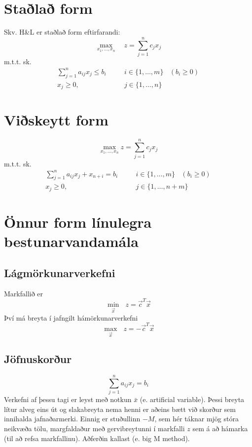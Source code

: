\lstset{language=matlab}

\section{Staðlað form}
Skv. H\&L er staðlað form eftirfarandi:
$$\max_{x_1,\ldots,x_n} \quad z = \sum_{j=1}^n c_j x_j  $$
m.t.t. sk.
\begin{eqnarray*}
\sum_{j=1}^n a_{ij} x_j  \le  b_i &\quad& i\in\{1,\ldots,m\}~~~~ (b_i \ge 0)\\
x_j  \ge  0, && j\in\{1,\ldots, n\}
\end{eqnarray*}
\section{Viðskeytt form}
$$\max_{x_1,\ldots,x_n}  z = \sum_{j=1}^n c_j x_j $$
m.t.t. sk.
\begin{eqnarray*}
\sum_{j=1}^n a_{ij} x_j  + x_{n+i} =  b_i &\quad& i\in\{1,\ldots,m\}~~~~ (b_i \ge 0)\\
x_j  \ge  0, && j\in\{1, \ldots, n+m\}
\end{eqnarray*}

\section{Önnur form línulegra bestunarvandamála}\label{Simplex:onnurform}
\subsection{Lágmörkunarverkefni}
Markfallið er 
$$\min_\vec{x}~~~z = \vec{c}^T\vec{x}$$
Því má breyta í jafngilt hámörkunarverkefni 
$$\max_\vec{x}~~~z = -\vec{c}^T\vec{x}$$

\subsection{Jöfnuskorður} 
$$\sum_{j=1}^n a_{ij} x_j =  b_i$$
Verkefni af þessu tagi er leyst með notkun  $\bar{x}$ (e. artificial variable). Þessi breyta lítur alveg eins út og slakabreyta nema henni er aðeins bætt við skorður sem innihalda jafnaðarmerki. Einnig er stuðullinn $-M$, sem hér táknar mjög stóra neikvæða tölu, margfaldaður með gervibreytunni í markfalli $z$ sem á að hámarka (til að refsa markfallinu).
Aðferðin kallast  (e. big M method).


